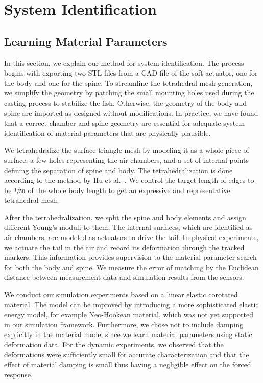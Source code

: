 \section{System Identification}
\subsection{Learning Material Parameters}
\label{system identification}
In this section, we explain our method for system identification. The process begins with exporting two STL files from a CAD file of the soft actuator, one for the body and one for the spine. To streamline the tetrahedral mesh generation, we simplify the geometry by patching the small mounting holes used during the casting process to stabilize the fish. Otherwise, the geometry of the body and spine are imported as designed without modifications. In practice, we have found that a correct chamber and spine geometry are essential for adequate system identification of material parameters that are physically plausible. 

We tetrahedralize the surface triangle mesh by modeling it as a whole piece of surface, a few holes representing the air chambers, and a set of internal points defining the separation of spine and body. The tetrahedralization is done according to the method by Hu et al.~\cite{hu2018tetrahedral}. We control the target length of edges to be $\sfrac{1}{50}$ of the whole body length to get an expressive and representative tetrahedral mesh.

After the tetrahedralization, we split the spine and body elements and assign different Young's moduli to them. The internal surfaces, which are identified as air chambers, are modeled as actuators to drive the tail. In physical experiments, we actuate the tail in the air and record its deformation through the tracked markers. This information provides supervision to the material parameter search for both the body and spine. We measure the error of matching by the Euclidean distance between measurement data and simulation results from the sensors.

We conduct our simulation experiments based on a linear elastic corotated material. The model can be improved by introducing a more sophisticated elastic energy model, for example Neo-Hookean material, which was not yet supported in our simulation framework. Furthermore, we chose not to include damping explicitly in the material model since we learn material parameters using static deformation data. For the dynamic experiments, we observed that the deformations were sufficiently small for accurate characterization and that the effect of material damping is small thus having a negligible effect on the forced response.

